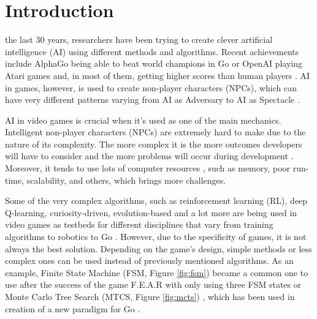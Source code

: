 \documentclass[journal]{IEEEtran}
\begin{document}
\section{Introduction} %
% 
% 
% 
% 
 the last 30 years, researchers have been trying to create clever artificial intelligence (AI) using different methods and algorithms. Recent achievements include AlphaGo being able to beat world champions in Go \cite{alphago} or OpenAI playing Atari games and, in most of them, getting higher scores than human players \cite{mnih2015human}. AI in games, however, is used to create non-player characters (NPCs), which can have very different patterns varying from AI as Adversary to AI as Spectacle \cite{treanor2015ai}. 

AI in video games is crucial when it's used as one of the main mechanics. Intelligent non-player characters (NPCs) are extremely hard to make due to the nature of its complexity. The more complex it is the more outcomes developers will have to consider and the more problems will occur during development \cite{gdchalo2}. Moreover, it tends to use lots of computer resources \cite{gdchalo2}, such as memory, poor run-time, scalability, and others, which brings more challenges.

Some of the very complex algorithms, such as reinforcement learning (RL), deep Q-learning, curiosity-driven, evolution-based and a lot more are being used in video games as testbeds for different disciplines that vary from training algorithms \cite{aiinvideogames}\cite{robotplayground} to robotics \cite{schmidhuber2006developmental}\cite{colledanchise2018behavior}\cite{brady1985artificial}\cite{oudeyer2004intelligent} to Go \cite{schaul2011measuring}\cite{alphago}. However, due to the specificity of games, it is not always the best solution. Depending on the game's design, simple methods or less complex ones can be used instead of previously mentioned algorithms. As an example, Finite State Machine (FSM, Figure \ref{fig:fsm}) became a common one to use after the success of the game F.E.A.R with only using three FSM states \cite{orkin2006three} or Monte Carlo Tree Search (MTCS, Figure \ref{fig:mcts}) \cite{chaslot2008monte}, which has been used in creation of a new paradigm for Go \cite{gelly2011monte}\cite{gelly2012grand}. %
\end{document}
